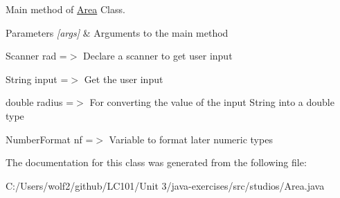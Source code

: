 Main method of \mbox{\hyperlink{classstudios_1_1_area}{Area}} Class. 
\begin{DoxyParams}{Parameters}
{\em \mbox{[}args\mbox{]}} & Arguments to the main method \\
\hline
\end{DoxyParams}
Scanner rad =$>$ Declare a scanner to get user input

String input =$>$ Get the user input

double radius =$>$ For converting the value of the input String into a double type

Number\+Format nf =$>$ Variable to format later numeric types 

The documentation for this class was generated from the following file\+:\begin{DoxyCompactItemize}
\item 
C\+:/\+Users/wolf2/github/\+L\+C101/\+Unit 3/java-\/exercises/src/studios/Area.\+java\end{DoxyCompactItemize}
